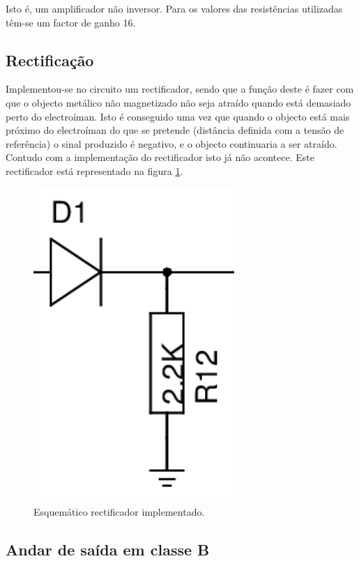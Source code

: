 \documentclass[%
  reprint,
  nofootinbib,
  amsmath,amssymb,
  aps,
  10pt,
  a4paper
]{revtex4-1}
\begin{document}
Isto é, um amplificador não inversor. Para os valores das resistências utilizadas têm-se um factor de ganho 16.








\subsection{Rectificação}
Implementou-se no circuito um rectificador, sendo que a função deste é fazer com que o objecto metálico não magnetizado não seja atraído quando está demasiado perto do electroíman. Isto é conseguido uma vez que quando o objecto está mais próximo do electroíman do que se pretende (distância definida com a tensão de referência) o sinal produzido é negativo, e o objecto continuaria a ser atraído. Contudo com a implementação do rectificador isto já não acontece. Este rectificador está representado na figura \ref{fig:rectificador}.
\begin{figure}[h]
\includegraphics[width=3in]{../img/rectificador.png}
\caption{Esquemático rectificador implementado.}
\label{fig:rectificador}
\end{figure}





\subsection{Andar de saída em classe B}
\end{document}
